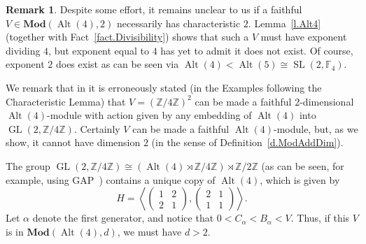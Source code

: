 \documentclass[a4paper, 11pt]{amsart}
\theoremstyle{plain}
\theoremstyle{definition}
\newtheorem{remark}[theorem]{Remark}
\theoremstyle{remark}
\DeclareMathOperator{\Alt}{Alt}
\DeclareMathOperator{\GL}{GL}
\DeclareMathOperator{\SL}{SL}
\newcommand{\Mod}{\mathbf{Mod}}
\newcommand{\bF}{\mathbb{F}}
\begin{document}
\begin{remark}
Despite some effort, it remains unclear to us if a faithful $V \in \Mod(\Alt(4), 2)$  necessarily has characteristic $2$. Lemma~\ref{l.Alt4} (together with Fact~\ref{fact.Divisibility}) shows that such a $V$ must have exponent dividing $4$, but exponent equal to $4$ has yet to admit it does not exist. Of course, exponent $2$ does exist as can be seen via $\Alt(4) < \Alt(5) \cong \SL(2,\bF_4)$.

We remark that in \cite{CDW23} it is erroneously stated (in the Examples following the Characteristic Lemma)   that $V = (\mathbb{Z}/4\mathbb{Z})^2$ can be made a faithful $2$-dimensional $\Alt(4)$-module with action given by any embedding of $\Alt(4)$ into $\GL\left(2,\mathbb{Z}/4\mathbb{Z}\right)$. Certainly $V$ can be made a faithful $\Alt(4)$-module, but, as we show, it cannot have dimension $2$ (in the sense of Definition~\ref{d.ModAddDim}). 

The group $\GL\left(2,\mathbb{Z}/4\mathbb{Z}\right) \cong (\Alt(4) \rtimes\mathbb{Z}/4\mathbb{Z})\rtimes\mathbb{Z}/2\mathbb{Z}$ (as can be seen, for example, using GAP~\cite{GAP4}) contains a unique copy of $\Alt(4)$, which is given by   
\[H=\left\langle 
\left(\begin{array}{cc}
1 & 2\\
2 & 1
\end{array}\right),
\left(\begin{array}{cc}
2 & 1\\
1 & 1
\end{array}\right)\right\rangle.\]
Let $\alpha$ denote the first generator, and notice that $0 < C_\alpha < B_\alpha < V$. Thus, if this $V$ is in $\Mod(\Alt(4), d)$, we must have $d>2$.
\end{remark}
\end{document}
